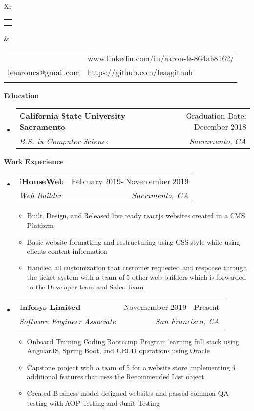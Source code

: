 \documentclass[letterpaper,12pt]{article}[leftmargin=*]
\makeatletter
\def \fullname {Aaron Le}
\def \subtitle {}
\def \linkedinicon {\faLinkedin}
\def \linkedinlink {https://www.linkedin.com/in/aaron-le-864ab8162/}
\def \linkedintext {www.linkedin.com/in/aaron-le-864ab8162/}
\def \phoneicon {\faPhone}
\def \phonetext {+1-916-833-6959}
\def \emailicon {\faEnvelope}
\def \emaillink {mailto:leaaroncs@gmail.com}
\def \emailtext {leaaroncs@gmail.com}
\def \githubicon {\faGithub}
\def \githublink {https://github.com/leaagithub}
\def \githubtext {https://github.com/leaagithub}
\def \headertype {\doublecol} %
\def \entryspacing {-0pt}
\def \linkedin {\linkedinicon \hspace{3pt}\href{\linkedinlink}{\linkedintext}}
\def \phone {\phoneicon \hspace{3pt}{ \phonetext}}
\def \email {\emailicon \hspace{3pt}\href{\emaillink}{\emailtext}}
\def \github {\githubicon \hspace{3pt}\href{\githublink}{\githubtext}}
\def \website {}
\renewcommand{\section}[2]{\vspace{5pt}
  \colorbox{secondary}{\color{white}\raggedbottom\normalsize\textbf{{#1}{\hspace{7pt}#2}}}
}
\newcommand{\resumeEntryStart}{\begin{itemize}[leftmargin=2.5mm]}
\newcommand{\resumeEntryEnd}{\end{itemize}\vspace{\entryspacing}}
\newcommand{\resumeItemListStart}{\begin{itemize}[leftmargin=4.5mm]}
\newcommand{\resumeItemListEnd}{\end{itemize}}
\newcommand{\resumeItem}[1]{
  \item\small{
    {#1 \vspace{-2pt}}
  }
}
\newcommand{\resumeEntryTSDL}[4]{
  \vspace{-1pt}\item[]
    \begin{tabularx}{0.97\textwidth}{X@{\hspace{60pt}}r}
      \textbf{\color{primary}#1} & {\firabook\color{accent}\small#2} \\
      \textit{\color{accent}\small#3} & \textit{\color{accent}\small#4} \\
    \end{tabularx}\vspace{-6pt}
}
\newcommand{\doublecol}[6]{
  \begin{tabularx}{\textwidth}{Xr}
    {
      \begin{tabular}[c]{l}
        \fontsize{35}{45}\selectfont{\color{primary}{{\textbf{\fullname}}}} \\
        {\textit{\subtitle}} %
      \end{tabular}
    } & {
      \begin{tabular}[c]{l@{\hspace{1.5em}}l}
        {\small#4} & {\small#1} \\
        {\small#5} & {\small#2} \\
        {\small#6} & {\small#3}
      \end{tabular}
    }
  \end{tabularx}
}
\newcommand{\singlecol}[6]{
  \begin{tabularx}{\textwidth}{Xr}
    {
      \begin{tabular}[b]{l}
        \fontsize{35}{45}\selectfont{\color{primary}{{\textbf{\fullname}}}} \\
        {\textit{\subtitle}} %
      \end{tabular}
    } & {
      \begin{tabular}[c]{l}
        {\small#1} \\
        {\small#2} \\
        {\small#3} \\
        {\small#4} \\
        {\small#5} \\
        {\small#6}
      \end{tabular}
    }
  \end{tabularx}
}
\makeatother
\begin{document}


\headertype{\linkedin}{\github}{\website}{\phone}{\email}{} %
\vspace{-10pt} %

\section{\faGraduationCap}{Education}

  \resumeEntryStart
    \resumeEntryTSDL
      {California State University Sacramento}{Graduation Date: December 2018}
      {B.S. in Computer Science}{Sacramento, CA}
  \resumeEntryEnd

\section{\faPieChart}{Work Experience}

  \resumeEntryStart
    \resumeEntryTSDL
      {iHouseWeb}{February 2019- Novemember 2019}
      {Web Builder}{Sacramento, CA}
    \resumeItemListStart
      \resumeItem {Built, Design, and Released live ready reactjs websites created in a CMS Platform}
      \resumeItem {Basic website formatting and restructuring using CSS style while using clients content information}
      \resumeItem {Handled all customization that customer requested and response through the ticket system with a team of 5 other web builders which is forwarded to the Developer team and Sales Team}
    \resumeItemListEnd
  \resumeEntryEnd

  \resumeEntryStart
    \resumeEntryTSDL
      {Infosys Limited}{Novemember 2019 - Present}
      {Software Engineer Associate}{San Francisco, CA}
    \resumeItemListStart
      \resumeItem {Onboard Training Coding Bootcamp Program learning full stack using AngularJS, Spring Boot, and CRUD operations using Oracle}
      \resumeItem {Capstone project with a team of 5 for a website store implementing 6 additional features that uses the Recommended List object}
      \resumeItem {Created Business model designed websites and passed common QA testing with AOP Testing and Junit Testing}
    \resumeItemListEnd
  \resumeEntryEnd
\end{document}
